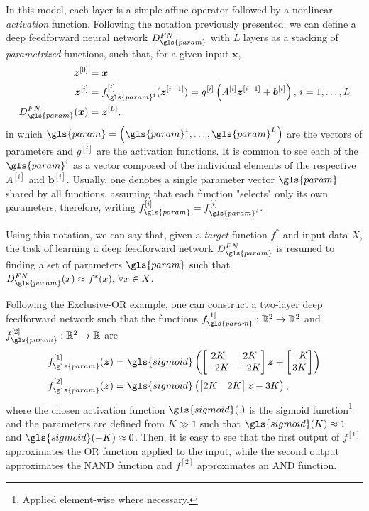In this model, each layer is a simple affine operator followed by a nonlinear \textit{activation} function. Following the notation previously presented, we can define a deep feedforward neural network $D_{\gls{param}}^{FN}$ with $L$ layers as a stacking of \textit{parametrized} functions, such that, for a given input $\bm{x}$,
\begin{align*}
    \bm{z}^{[0]} &= \bm{x} \\
    \bm{z}^{[i]} &= f_{\gls{param}^i}^{[i]}(\bm{z}^{[i-1]}) = g^{[i]}\left(A^{[i]}\bm{z}^{[i-1]} + \bm{b}^{[i]}\right) ,\,i=1,\ldots,L \\
    D_{\gls{param}}^{FN}(\bm{x}) &= \bm{z}^{[L]}
,\end{align*}
in which $\gls{param}=\left( \gls{param}^1,\ldots,\gls{param}^L \right) $ are the vectors of parameters and $g^{[i]}$ are the activation functions.
It is common to see each of the $\gls{param}^i$ as a vector composed of the individual elements of the respective $A^{[i]}$ and $\bm{b}^{[i]}$.
Usually, one denotes a single parameter vector $\gls{param}$ shared by all functions, assuming that each function "selects" only its own parameters, therefore, writing $f_{\gls{param}}^{[i]} = f_{\gls{param}^i}^{[i]}$.

Using this notation, we can say that, given a \textit{target} function $f^*$ and input data $X$, the task of learning a deep feedforward network $D_{\gls{param}}^{FN}$ is resumed to finding a set of parameters $\gls{param}$ such that $D^{FN}_{\gls{param}}(x) \approx f^*(x),\,\forall x \in X$.

Following the Exclusive-OR example, one can construct a two-layer deep feedforward network such that the functions $f_{\gls{param}}^{[1]}:\R^2\to\R^2$ and $f_{\gls{param}}^{[2]}:\R^2\to\R$ are
\begin{align*}
    f_{\gls{param}}^{[1]}(\bm{z}) &= \gls{sigmoid}\left(
    \begin{bmatrix}
    2K & 2K \\
    -2K & -2K
    \end{bmatrix}\bm{z} + \begin{bmatrix}
    -K \\
    3K
    \end{bmatrix}\right) \\
    f_{\gls{param}}^{[2]}(\bm{z}) &= \gls{sigmoid}\left(
    \begin{bmatrix}
    2K & 2K
    \end{bmatrix}\bm{z} - 3K\right)
,\end{align*}
where the chosen activation function $\gls{sigmoid}(.)$ is the sigmoid function\footnote{Applied element-wise where necessary.} and the parameters are defined from $K \gg 1$ such that $\gls{sigmoid}(K) \approx 1$ and $\gls{sigmoid}(-K) \approx 0$.
Then, it is easy to see that the first output of $f^{[1]}$ approximates the OR function applied to the input, while the second output approximates the NAND function and $f^{[2]}$ approximates an AND function.

